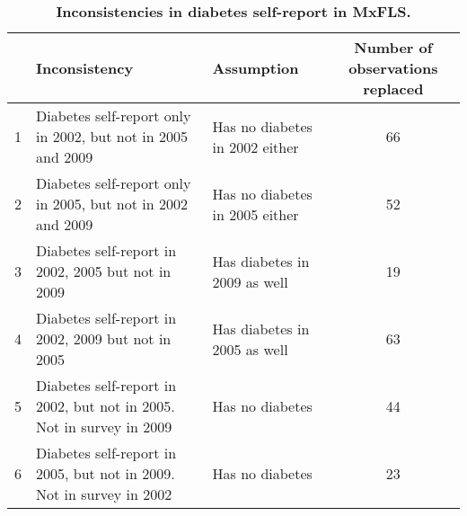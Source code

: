 \documentclass[10pt,letterpaper]{article}
\providecommand{\tabularnewline}{\\}
\begin{document}
	\begin{table}[p]
		\caption{\label{tab:Inconsistencies}{\bf Inconsistencies in diabetes self-report in MxFLS.}}
		\begin{center}
			\begin{adjustbox}{max width=\linewidth} 
				\begin{tabular}{lllc}
					\hline 
					&Inconsistency  & Assumption  & Number of observations replaced\tabularnewline
					\hline 
					1 &Diabetes self-report only in 2002, but not in 2005 and 2009  & Has no diabetes in 2002 either  & 66\tabularnewline
					2 &Diabetes self-report only in 2005, but not in 2002 and 2009  & Has no diabetes in 2005 either  & 52\tabularnewline
					3 &Diabetes self-report in 2002, 2005 but not in 2009  & Has diabetes in 2009 as well  & 19\tabularnewline
					4 &Diabetes self-report in 2002, 2009 but not in 2005  & Has diabetes in 2005 as well  & 63\tabularnewline
					5 &Diabetes self-report in 2002, but not in 2005. Not in survey in 2009  & Has no diabetes  & 44\tabularnewline
					6 &Diabetes self-report in 2005, but not in 2009. Not in survey in 2002  & Has no diabetes  & 23\tabularnewline
				\end{tabular}
			\end{adjustbox}
		\end{center}
	\end{table}
	
	
	
\end{document}

